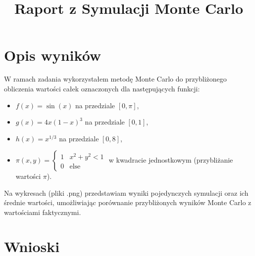 \documentclass{article}
\title{Raport z Symulacji Monte Carlo}
\author{}
\date{}
\begin{document}
\maketitle

\section*{Opis wyników}

W ramach zadania wykorzystałem metodę Monte Carlo do przybliżonego obliczenia wartości całek oznaczonych dla następujących funkcji:
\begin{itemize}
    \item \( f(x) = \sin(x) \) na przedziale \( [0, \pi] \),
    \item \( g(x) = 4x(1 - x)^3 \) na przedziale \( [0, 1] \),
    \item \( h(x) = x^{1/3} \) na przedziale \( [0, 8] \),
    \item \( \pi(x, y) = \begin{cases} 1 & \text{} x^2 + y^2 < 1 \\ 0 & \text{else} \end{cases} \) w kwadracie jednostkowym (przybliżanie wartości \(\pi\)).
\end{itemize}

Na wykresach (pliki .png) przedstawiam wyniki pojedynczych symulacji oraz ich średnie wartości, umożliwiając porównanie przybliżonych wyników Monte Carlo z wartościami faktycznymi.

\section*{Wnioski}
\end{document}
